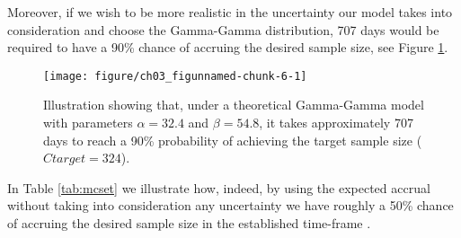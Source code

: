 Moreover, if we wish to be more realistic in the uncertainty our model takes into consideration and choose the Gamma-Gamma distribution, 707 days would be required to have a 90\% chance of accruing the desired sample size, see Figure \ref{fig:3_5}. 


\begin{figure}[h]
\begin{knitrout}
\color{fgcolor}
\texttt{[image: figure/ch03\_figunnamed-chunk-6-1]} 
\end{knitrout}
\caption{Illustration showing that, under a theoretical Gamma-Gamma model with parameters $\alpha = 32.4$ and $\beta = 54.8$, it takes approximately 707 days to reach a 90\% probability of achieving the target sample size ($Ctarget = 324$).}
\label{fig:3_5}
\end{figure}

In Table \ref{tab:mcset} we illustrate how, indeed, by using the expected accrual without taking into consideration any uncertainty we have roughly a 50\% chance of accruing the desired sample size in the established time-frame \citep{carter2004application}.

